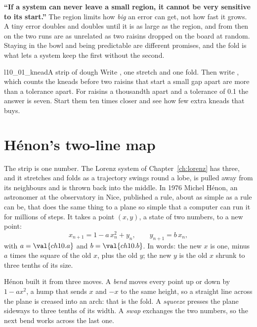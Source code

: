 \begin{trapbox}
\textbf{\enquote{If a system can never leave a small region, it cannot be very
sensitive to its start.}} The region limits how \emph{big} an error can get,
not how fast it grows. A tiny error doubles and doubles until it is as large
as the region, and from then on the two runs are as unrelated as two raisins
dropped on the board at random. Staying in the bowl and being predictable are
different promises, and the fold is what lets a system keep the first
without the second.
\end{trapbox}

\begin{lab}{l10_01_knead}{A strip of dough}
Write , one stretch and one fold. Then write
, which counts the kneads before two raisins that
start a small gap apart are more than a tolerance apart. For raisins a
thousandth apart and a tolerance of \num{0.1} the answer is seven. Start them
ten times closer and see how few extra kneads that buys.
\end{lab}

\section{Hénon's two-line map}
\label{sec:ch10-henon}

\noindent
The strip is one number. The Lorenz system of Chapter~\ref{ch:lorenz} has
three, and it stretches and folds as a trajectory swings round a lobe, is
pulled away from its neighbours and is thrown back into the middle. In 1976
Michel Hénon, an astronomer at the observatory in Nice, published a rule,
about as simple as a rule can be, that does the same thing to a plane
\dash{} so simple that a computer can run it for millions of steps. It takes
a point $(x, y)$, a state of two numbers, to a new point:
\[ x_{n+1} = 1 - a\,x_n^{2} + y_n, \qquad y_{n+1} = b\,x_n, \]
with $a = \val{ch10.a}$ and $b = \val{ch10.b}$. In words: the new $x$ is one,
minus $a$ times the square of the old $x$, plus the old $y$; the new $y$ is
the old $x$ shrunk to three tenths of its size.

Hénon built it from three moves. A \emph{bend} moves every point up or down
by $1 - a x^{2}$, a hump that sends $x$ and $-x$ to the same height, so a
straight line across the plane is creased into an arch: that is the fold. A
\emph{squeeze} presses the plane sideways to three tenths of its width. A
\emph{swap} exchanges the two numbers, so the next bend works across the
last one.

